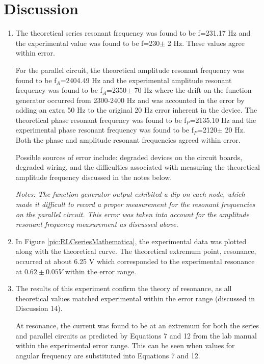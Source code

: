 \documentclass[justified]{tufte-book}
\begin{document}
\section{Discussion}
\begin{enumerate}[resume]
\item The theoretical series resonant frequency was found to be f=231.17 Hz and the experimental value was found to be f=230$\pm$ 2 Hz. These values agree within error. 

For the parallel circuit, the theoretical amplitude resonant frequency was found to be f$_A$=2404.49 Hz and the experimental amplitude resonant frequency was found to be f$_A$=2350$\pm$ 70 Hz where the drift on the function generator occurred from 2300-2400 Hz and was accounted in the error by adding an extra 50 Hz to the original 20 Hz error inherent in the device. The theoretical phase resonant frequency was found to be f$_P$=2135.10 Hz and the experimental phase resonant frequency was found to be f$_P$=2120$\pm$ 20 Hz. Both the phase and amplitude resonant frequencies agreed within error.

Possible sources of error include: degraded devices on the circuit boards, degraded wiring, and the difficulties associated with measuring the theoretical amplitude frequency discussed in the notes below.

\textit{Notes: The function generator output exhibited a dip on each node, which made it difficult to record a proper measurement for the resonant frequencies on the parallel circuit. This error was taken into account for the amplitude resonant frequency measurement as discussed above.}
\item In Figure \ref{pic:RLCseriesMathematica}, the experimental data was plotted along with the theoretical curve. The theoretical extremum point, resonance, occurred at about 6.25 V which corresponded to the experimental resonance at $0.62\pm0.05 V$ within the error range. 
\item The results of this experiment confirm the theory of resonance, as all theoretical values matched experimental within the error range (discussed in Discussion 14).

At resonance, the current was found to be at an extremum for both the series and parallel circuits as predicted by Equations 7 and 12 from the lab manual within the experimental error range. This can be seen when values for angular frequency are substituted into Equations 7 and 12.

\end{enumerate}
\end{document}
